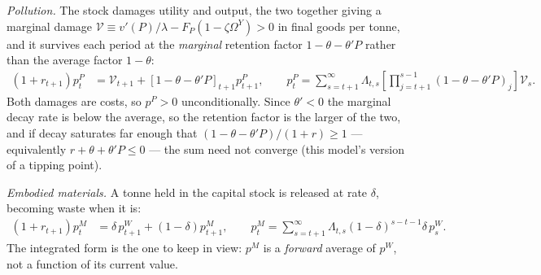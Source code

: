 \emph{Pollution.} The stock damages utility and output, the two together giving a marginal damage $\mathcal V\equiv v'\left(P\right)/\lambda-F_P\left(1-\zeta\Omega^Y\right)>0$ in final goods per tonne, and it survives each period at the \emph{marginal} retention factor $1-\theta-\theta'P$ rather than the average factor $1-\theta$:
\begin{align}
\left(1+r_{t+1}\right)p^P_t &= \mathcal V_{t+1}+\left[1-\theta-\theta'P\right]_{t+1}p^P_{t+1},
\qquad
p^P_t=\sum_{s=t+1}^\infty \Lambda_{t,s}\left[\prod_{j=t+1}^{s-1}\left(1-\theta-\theta'P\right)_j\right]\mathcal V_s .
\label{eq:sp:sum:P}
\end{align}
Both damages are costs, so $p^P>0$ unconditionally. Since $\theta'<0$ the marginal decay rate is below the average, so the retention factor is the larger of the two, and if decay saturates far enough that $\left(1-\theta-\theta'P\right)/\left(1+r\right)\ge1$ --- equivalently $r+\theta+\theta'P\le0$ --- the sum need not converge (this model's version of a tipping point).

\emph{Embodied materials.} A tonne held in the capital stock is released at rate $\delta$, becoming waste when it is:
\begin{align}
\left(1+r_{t+1}\right)p^M_t &= \delta\,p^W_{t+1}+\left(1-\delta\right)p^M_{t+1},
\qquad
p^M_t=\sum_{s=t+1}^\infty \Lambda_{t,s}\left(1-\delta\right)^{s-t-1}\delta\,p^W_s .
\label{eq:sp:sum:M}
\end{align}
The integrated form is the one to keep in view: $p^M$ is a \emph{forward} average of $p^W$, not a function of its current value.

